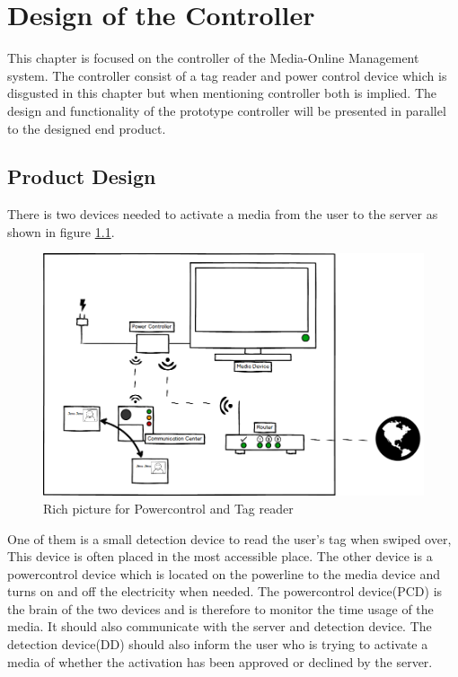 \chapter{Design of the Controller}
\label{chap:controller}
This chapter is focused on the controller of the Media-Online Management system. The controller consist of a tag reader and power control device which is disgusted in this chapter but when mentioning controller both is implied. \newline
The design and functionality of the prototype controller will be presented in parallel to the designed end product. \newline

\section{Product Design}

There is two devices needed to activate a media from the user to the server as shown in figure \ref{fig:Power&Tagdevice}.


\begin{figure}[h]
	\centering
		\includegraphics[width=1.00\textwidth]{images/Power&Tagdevice.png}
	\caption{Rich picture for Powercontrol and Tag reader}
	\label{fig:Power&Tagdevice}
\end{figure}

One of them is a small detection device to read the user's tag when swiped over, This device is often placed in the most accessible place. \newline
The other device is a powercontrol device which is located on the powerline to the media device and turns on and off the electricity when needed.\newline
The powercontrol device(PCD) is the brain of the two devices and is therefore to monitor the time usage of the media. It should also communicate with the server and detection device. \newline
The detection device(DD) should also inform the user who is trying to activate a media of whether the activation has been approved or declined by the server.


